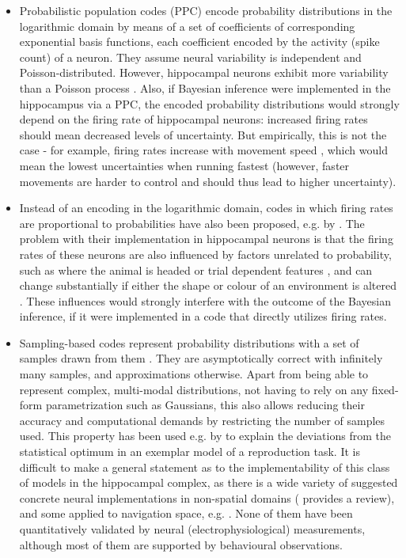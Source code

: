 \begin{itemize}

\item Probabilistic population codes (PPC) \citep{ma2006bayesian} encode probability distributions in the logarithmic domain by means of a set of coefficients of corresponding exponential basis functions, each coefficient encoded by the activity (spike count) of a neuron. They assume neural variability is independent and Poisson-distributed. However, hippocampal neurons exhibit more variability than a Poisson process \citep{fenton1998place, barbieri2001construction}. Also, if Bayesian inference were implemented in the hippocampus via a PPC, the encoded probability distributions would strongly depend on the firing rate of hippocampal neurons: increased firing rates should mean decreased levels of uncertainty. But empirically, this is not the case - for example, firing rates increase with movement speed \citep{maurer2005self}, which would mean the lowest uncertainties when running fastest (however, faster movements are harder to control and should thus lead to higher uncertainty). 

\item Instead of an encoding in the logarithmic domain, codes in which firing rates are proportional to probabilities have also been proposed, e.g. by \citet{koechlin1999bayesian, barber2003neural}. The problem with their implementation in hippocampal neurons is that the firing rates of these neurons are also influenced by factors unrelated to probability, such as where the animal is headed \citep{ferbinteanu2003prospective} or trial dependent features \citep{allen2012hippocampal}, and can change substantially if either the shape or colour of an environment is altered \citep{leutgeb2005independent}. These influences would strongly interfere with the outcome of the Bayesian inference, if it were implemented in a code that directly utilizes firing rates.

\item Sampling-based codes represent probability distributions with a set of samples drawn from them \citep{fiser2010statistically}. They are asymptotically correct with infinitely many samples, and approximations otherwise. Apart from being able to represent complex, multi-modal distributions, not having to rely on any fixed-form parametrization such as Gaussians, this also allows reducing their accuracy and computational demands by restricting the number of samples used. This property has been used e.g. by \citep{shi2010exemplar} to explain the deviations from the statistical optimum in an exemplar model of a reproduction task. It is difficult to make a general statement as to the implementability of this class of models in the hippocampal complex, as there is a wide variety of suggested concrete neural implementations in non-spatial domains (\citet{sanborn2015types} provides a review), and some applied to navigation space, e.g. \citep{fox2010hippocampus, cheung2012maintaining}. None of them have been quantitatively validated by neural (electrophysiological) measurements, although most of them are supported by behavioural observations. 


\end{itemize}
